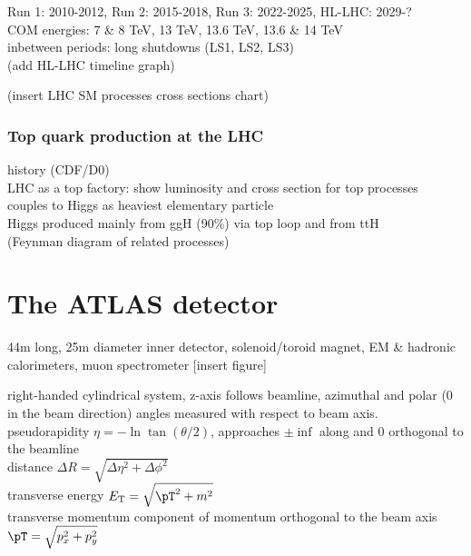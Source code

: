\documentclass[../thesis.tex]{subfiles}
\begin{document}
Run 1: 2010-2012, Run 2: 2015-2018, Run 3: 2022-2025, HL-LHC: 2029-?\\
COM energies: 7 \& 8 TeV, 13 TeV, 13.6 TeV, 13.6 \& 14 TeV\\
inbetween periods: long shutdowns (LS1, LS2, LS3)\\
(add HL-LHC timeline graph)


(insert LHC SM processes cross sections chart)
\subsubsection*{Top quark production at the LHC}
history (CDF/D0)\\
LHC as a top factory: show luminosity and cross section for top processes\\
couples to Higgs as heaviest elementary particle\\
Higgs produced mainly from ggH (90\%) via top loop and from ttH\\
(Feynman diagram of related processes)


\section{The ATLAS detector}
\label{sec:ATLAS}
44m long, 25m diameter
inner detector, solenoid/toroid magnet, EM \& hadronic calorimeters, muon spectrometer
[insert figure]


right-handed cylindrical system, z-axis follows beamline, azimuthal and polar (0 in the beam direction) angles measured with respect to beam axis.\\
pseudorapidity $\eta = -\ln \tan (\theta/2)$, approaches $\pm\inf$ along and 0 orthogonal to the beamline\\
distance $\Delta R=\sqrt{\Delta \eta^2 + \Delta \phi^2}$\\
transverse energy $E_\text{T}=\sqrt{\pT ^2+m^2}$\\
transverse momentum \pT component of momentum orthogonal to the beam axis $\pT = \sqrt{p_x^2 + p_y^2}$
\end{document}
